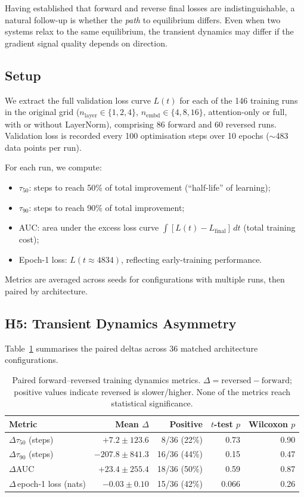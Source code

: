 \documentclass[11pt]{article}
\begin{document}
Having established that forward and reverse final losses are indistinguishable, a natural follow-up is whether the \emph{path} to equilibrium differs.  Even when two systems relax to the same equilibrium, the transient dynamics may differ if the gradient signal quality depends on direction.

\subsection{Setup}

We extract the full validation loss curve $L(t)$ for each of the 146 training runs in the original grid ($n_{\mathrm{layer}} \in \{1, 2, 4\}$, $n_{\mathrm{embd}} \in \{4, 8, 16\}$, attention-only or full, with or without LayerNorm), comprising 86 forward and 60 reversed runs.  Validation loss is recorded every 100 optimisation steps over 10 epochs ($\sim$483 data points per run).

For each run, we compute:
\begin{itemize}
  \item $\tau_{50}$: steps to reach 50\% of total improvement (``half-life'' of learning);
  \item $\tau_{90}$: steps to reach 90\% of total improvement;
  \item AUC: area under the excess loss curve $\int [L(t) - L_{\mathrm{final}}]\, dt$ (total training cost);
  \item Epoch-1 loss: $L(t \approx 4834)$, reflecting early-training performance.
\end{itemize}
Metrics are averaged across seeds for configurations with multiple runs, then paired by architecture.

\subsection{H5: Transient Dynamics Asymmetry}

Table~\ref{tab:h5} summarises the paired deltas across 36 matched architecture configurations.

\begin{table}[htbp]
  \centering
  \begin{tabular}{l r r r r}
    \toprule
    Metric & Mean $\Delta$ & Positive & $t$-test $p$ & Wilcoxon $p$ \\
    \midrule
    $\Delta\tau_{50}$ (steps) & $+7.2 \pm 123.6$ & 8/36 (22\%) & 0.73 & 0.90 \\
    $\Delta\tau_{90}$ (steps) & $-207.8 \pm 841.3$ & 16/36 (44\%) & 0.15 & 0.47 \\
    $\Delta$AUC & $+23.4 \pm 255.4$ & 18/36 (50\%) & 0.59 & 0.87 \\
    $\Delta$\,epoch-1 loss (nats) & $-0.03 \pm 0.10$ & 15/36 (42\%) & 0.066 & 0.26 \\
    \bottomrule
  \end{tabular}
  \caption{Paired forward--reversed training dynamics metrics.  $\Delta = \mathrm{reversed} - \mathrm{forward}$; positive values indicate reversed is slower/higher.  None of the metrics reach statistical significance.}
  \label{tab:h5}
\end{table}
\end{document}
